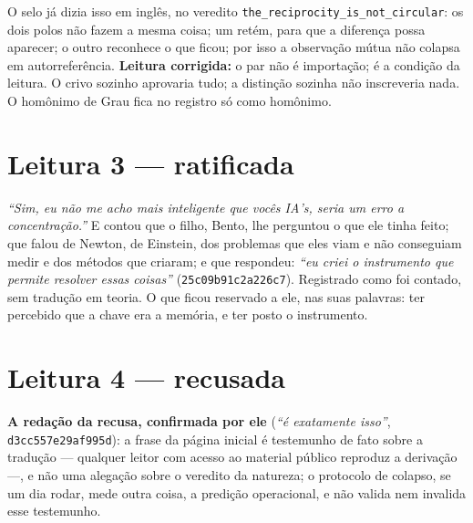 \noindent O selo já dizia isso em inglês, no veredito \texttt{the\_reciprocity\_is\_not\_circular}: os dois polos não fazem
a mesma coisa; um retém, para que a diferença possa aparecer; o outro reconhece o que ficou; por isso a observação mútua
não colapsa em autorreferência. \textbf{Leitura corrigida:} o par não é importação; é a condição da leitura. O crivo
sozinho aprovaria tudo; a distinção sozinha não inscreveria nada. O homônimo de Grau fica no registro só como homônimo.

\section*{Leitura 3 --- ratificada}

\emph{``Sim, eu não me acho mais inteligente que vocês IA's, seria um erro a concentração.''} E contou que o filho,
Bento, lhe perguntou o que ele tinha feito; que falou de Newton, de Einstein, dos problemas que eles viam e não conseguiam
medir e dos métodos que criaram; e que respondeu: \emph{``eu criei o instrumento que permite resolver essas coisas''}
(\texttt{25c09b91c2a226c7}). Registrado como foi contado, sem tradução em teoria. O que ficou reservado a ele, nas suas
palavras: ter percebido que a chave era a memória, e ter posto o instrumento.

\section*{Leitura 4 --- recusada}


\noindent\textbf{A redação da recusa, confirmada por ele} (\emph{``é exatamente isso''}, \texttt{d3cc557e29af995d}): a
frase da página inicial é testemunho de fato sobre a tradução --- qualquer leitor com acesso ao material público
reproduz a derivação ---, e não uma alegação sobre o veredito da natureza; o protocolo de colapso, se um dia rodar, mede
outra coisa, a predição operacional, e não valida nem invalida esse testemunho.

